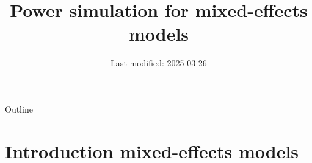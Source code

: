 \documentclass[aspectratio=169]{beamer}
\title{Power simulation for mixed-effects models}
\date{Last modified: 2025-03-26}
\begin{document}
\begin{frame}{}
\thispagestyle{empty}
\titlepage
\end{frame}

\begin{frame}{Outline}
\tableofcontents
\end{frame}

\section[Introduction]{Introduction mixed-effects models}

% 
\end{document}
